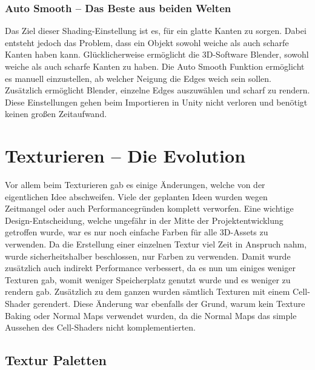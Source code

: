 \subsubsection{Auto Smooth – Das Beste aus beiden Welten}

Das Ziel dieser Shading-Einstellung ist es, für ein glatte Kanten zu sorgen. Dabei entsteht jedoch das Problem, dass ein Objekt sowohl weiche als auch scharfe Kanten haben kann. Glücklicherweise ermöglicht die 3D-Software Blender, sowohl weiche als auch scharfe Kanten zu haben. Die Auto Smooth Funktion ermöglicht es manuell einzustellen, ab welcher Neigung die Edges weich sein sollen. 
Zusätzlich ermöglicht Blender, einzelne Edges auszuwählen und scharf zu rendern. Diese Einstellungen gehen beim Importieren in Unity nicht verloren und benötigt keinen großen Zeitaufwand.

\section{Texturieren – Die Evolution}

Vor allem beim Texturieren gab es einige Änderungen, welche von der eigentlichen Idee abschweifen. Viele der geplanten Ideen wurden wegen Zeitmangel oder auch Performancegründen komplett verworfen. Eine wichtige Design-Entscheidung, welche ungefähr in der Mitte der Projektentwicklung getroffen wurde, war es nur noch einfache Farben für alle 3D-Assets zu verwenden. Da die Erstellung einer einzelnen Textur viel Zeit in Anspruch nahm, wurde sicherheitshalber beschlossen, nur Farben zu verwenden. Damit wurde zusätzlich auch indirekt Performance verbessert, da es nun um einiges weniger Texturen gab, womit weniger Speicherplatz genutzt wurde und es weniger zu rendern gab. Zusätzlich zu dem ganzen wurden sämtlich Texturen mit einem Cell-Shader gerendert.
Diese Änderung war ebenfalls der Grund, warum kein Texture Baking oder Normal Maps verwendet wurden, da die Normal Maps das simple Aussehen des Cell-Shaders nicht komplementierten.

\subsection{Textur Paletten}

